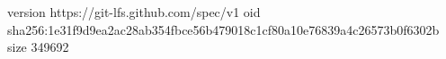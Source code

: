 version https://git-lfs.github.com/spec/v1
oid sha256:1e31f9d9ea2ac28ab354fbce56b479018c1cf80a10e76839a4c26573b0f6302b
size 349692
